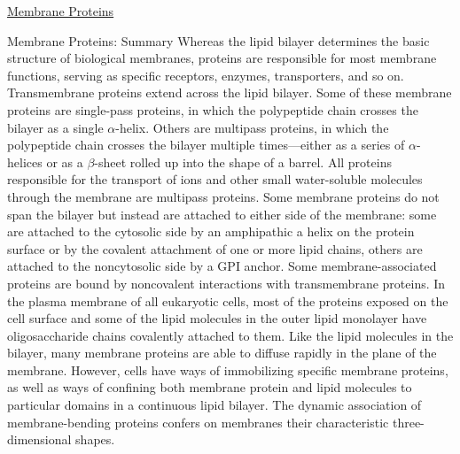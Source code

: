 \documentclass[12pt,letterpaper]{article}
\begin{document}
\begin{secbox}{\hyperlink{10}{Membrane Proteins}}
{    \begin{probbox}{Membrane Proteins: Summary}
        Whereas the lipid bilayer determines the basic structure of biological membranes, proteins are responsible for most membrane functions, serving as specific receptors, enzymes, transporters, and so on. Transmembrane proteins extend across the lipid bilayer. Some of these membrane proteins are single-pass proteins, in which the polypeptide chain crosses the bilayer as a single \(\alpha\)-helix. Others are multipass proteins, in which the polypeptide chain crosses the bilayer multiple times---either as a series of \(\alpha\)-helices or as a \(\beta\)-sheet rolled up into the shape of a barrel. All proteins responsible for the transport of ions and other small water-soluble molecules through the membrane are multipass proteins. Some membrane proteins do not span the bilayer but instead are attached to either side of the membrane: some are attached to the cytosolic side by an amphipathic a helix on the protein surface or by the covalent attachment of one or more lipid chains, others are attached to the noncytosolic side by a GPI anchor. Some membrane-associated proteins are bound by noncovalent interactions with transmembrane proteins. In the plasma membrane of all eukaryotic cells, most of the proteins exposed on the cell surface and some of the lipid molecules in the outer lipid monolayer have oligosaccharide chains covalently attached to them. Like the lipid molecules in the bilayer, many membrane proteins are able to diffuse rapidly in the plane of the membrane. However, cells have ways of immobilizing specific membrane proteins, as well as ways of confining both membrane protein and lipid molecules to particular domains in a continuous lipid bilayer. The dynamic association of membrane-bending proteins confers on membranes their characteristic three-dimensional shapes.
    \end{probbox}
}\end{secbox}
\end{document}
